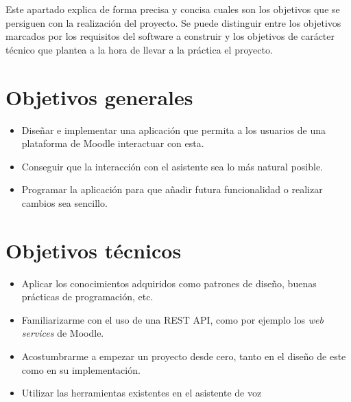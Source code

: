 
Este apartado explica de forma precisa y concisa cuales son los objetivos que se persiguen con la realización del proyecto. Se puede distinguir entre los objetivos marcados por los requisitos del software a construir y los objetivos de carácter técnico que plantea a la hora de llevar a la práctica el proyecto.

\section{Objetivos generales}

\begin{itemize}
	\item Diseñar e implementar una aplicación que permita a los usuarios de una plataforma de Moodle interactuar con esta.
	\item Conseguir que la interacción con el asistente sea lo más natural posible.
	\item Programar la aplicación para que añadir futura funcionalidad o realizar cambios sea sencillo.
\end{itemize}

\section{Objetivos técnicos}

\begin{itemize}
	\item Aplicar los conocimientos adquiridos como patrones de diseño, buenas prácticas de programación, etc.
	\item Familiarizarme con el uso de una REST API, como por ejemplo los \textit{web services} de Moodle.
	\item Acostumbrarme a empezar un proyecto desde cero, tanto en el diseño de este como en su implementación.
	\item Utilizar las herramientas existentes en el asistente de voz
\end{itemize}